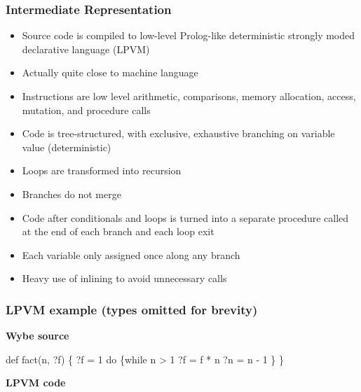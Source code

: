 \documentclass[12pt]{beamer}
\begin{document}
%
\begin{frame}[fragile]
\frametitle{Intermediate Representation}
\begin{itemize}
\item Source code is compiled to low-level Prolog-like deterministic
  strongly moded declarative language (LPVM)
\item Actually quite close to machine language
\item Instructions are low level arithmetic, comparisons, memory allocation,
  access, mutation, and procedure calls
\item Code is tree-structured, with exclusive, exhaustive branching on variable
  value (deterministic)
\item Loops are transformed into recursion
\item Branches do not merge
\item Code after conditionals and loops is turned into a separate procedure
  called at the end of each branch and each loop exit
\item Each variable only assigned once along any branch
\item Heavy use of inlining to avoid unnecessary calls
\end{itemize}
\end{frame}


\begin{frame}[fragile]
  \frametitle{LPVM example (types omitted for brevity)}
  \begin{minipage}{.35\linewidth}
\centerline{\textbf{Wybe source}}
\begin{semiverbatim}
def fact(n, ?f) \{
    ?f = 1
    do \{while n > 1
        ?f = f * n
        ?n = n - 1
    \}
\}
\end{semiverbatim}
  \end{minipage}
\qquad
  \begin{minipage}{.55\linewidth}
\centerline{\textbf{LPVM code}}
  \end{minipage}
\end{frame}
\end{document}
